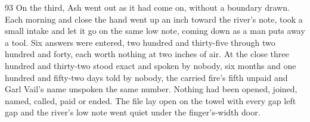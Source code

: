 \begin{CRchronicle}{93}
On the third, Ash went out as it had come on, without a boundary drawn. Each morning and close the hand went up an inch toward the river’s note, took a small intake and let it go on the same low note, coming down as a man puts away a tool. Six answers were entered, two hundred and thirty-five through two hundred and forty, each worth nothing at two inches of air. At the close three hundred and thirty-two stood exact and spoken by nobody, six months and one hundred and fifty-two days told by nobody, the carried fire’s fifth unpaid and Garl Vail’s name unspoken the same number. Nothing had been opened, joined, named, called, paid or ended. The file lay open on the towel with every gap left gap and the river’s low note went quiet under the finger’s-width door.
\end{CRchronicle}
